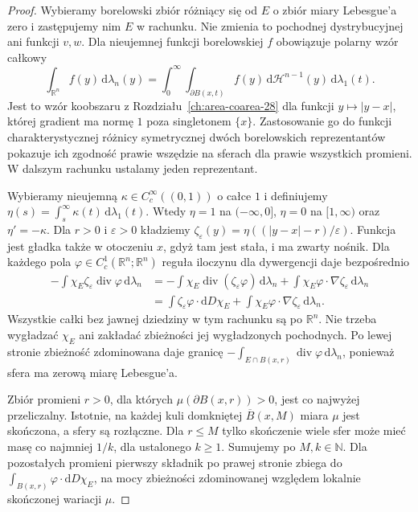 \begin{proof}
Wybieramy borelowski zbiór różniący się od $E$
o zbiór miary Lebesgue'a zero i zastępujemy nim
$E$ w rachunku. Nie zmienia to pochodnej
dystrybucyjnej ani funkcji $v,w$.
Dla nieujemnej funkcji borelowskiej $f$ obowiązuje
polarny wzór całkowy
\[
 \int_{\mathbb R^n} f(y)\,\mathrm d\lambda_n(y)
 =\int_0^\infty\int_{\partial B(x,t)} f(y)
 \,\mathrm d\mathcal H^{n-1}(y)\,\mathrm d\lambda_1(t).
\]
Jest to wzór koobszaru z Rozdziału~\ref{ch:area-coarea-28}
dla funkcji $y\mapsto|y-x|$, której gradient ma normę
$1$ poza singletonem $\{x\}$.
Zastosowanie go do funkcji charakterystycznej
różnicy symetrycznej dwóch borelowskich reprezentantów
pokazuje ich zgodność prawie wszędzie na sferach
dla prawie wszystkich promieni. W dalszym rachunku
ustalamy jeden reprezentant.

Wybieramy nieujemną $\kappa\in C_c^\infty((0,1))$
o całce $1$ i definiujemy
$\eta(s)=\int_s^\infty\kappa(t)\,\mathrm d\lambda_1(t)$.
Wtedy $\eta=1$ na $(-\infty,0]$, $\eta=0$
na $[1,\infty)$ oraz $\eta'=-\kappa$.
Dla $r>0$ i $\varepsilon>0$ kładziemy
$\zeta_\varepsilon(y)=\eta((|y-x|-r)/\varepsilon)$.
Funkcja jest gładka także w otoczeniu $x$,
gdyż tam jest stała, i ma zwarty nośnik.
Dla każdego pola $\varphi\in C_c^1(\mathbb R^n;\mathbb R^n)$
reguła iloczynu dla dywergencji daje bezpośrednio
\begin{align*}
 -\int \chi_E\zeta_\varepsilon\operatorname{div}\varphi
 \,\mathrm d\lambda_n
 &=-\int\chi_E\operatorname{div}(\zeta_\varepsilon\varphi)
 \,\mathrm d\lambda_n
 +\int\chi_E\varphi\cdot\nabla\zeta_\varepsilon
 \,\mathrm d\lambda_n\\
 &=\int\zeta_\varepsilon\varphi\cdot\mathrm dD\chi_E
 +\int\chi_E\varphi\cdot\nabla\zeta_\varepsilon
 \,\mathrm d\lambda_n.
\end{align*}
Wszystkie całki bez jawnej dziedziny w tym rachunku
są po $\mathbb R^n$.
Nie trzeba wygładzać $\chi_E$ ani zakładać
zbieżności jej wygładzonych pochodnych.
Po lewej stronie zbieżność zdominowana daje
granicę $-\int_{E\cap B(x,r)}\operatorname{div}\varphi
\,\mathrm d\lambda_n$, ponieważ sfera ma zerową
miarę Lebesgue'a.

Zbiór promieni $r>0$, dla których
$\mu(\partial B(x,r))>0$, jest co najwyżej
przeliczalny. Istotnie, na każdej kuli domkniętej
$\overline B(x,M)$ miara $\mu$ jest skończona,
a sfery są rozłączne. Dla $r\le M$ tylko skończenie
wiele sfer może mieć masę co najmniej $1/k$,
dla ustalonego $k\ge1$. Sumujemy po $M,k\in\mathbb N$.
Dla pozostałych promieni pierwszy składnik po
prawej stronie zbiega do
$\int_{B(x,r)}\varphi\cdot\mathrm dD\chi_E$,
na mocy zbieżności zdominowanej względem
lokalnie skończonej wariacji $\mu$.


\end{proof}
